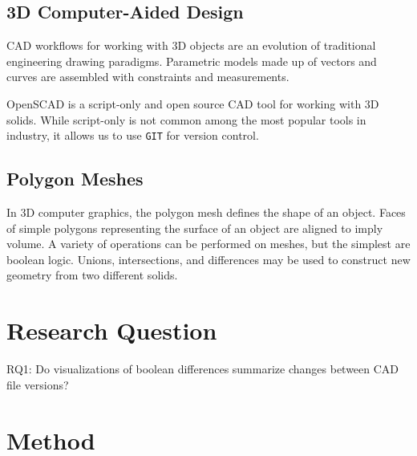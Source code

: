 \documentclass[sigconf,]{acmart}
\begin{document}



\subsection{3D Computer-Aided Design}

CAD workflows for working with 3D objects are an evolution of traditional engineering drawing paradigms.
Parametric models made up of vectors and curves are assembled with constraints and measurements.

OpenSCAD is a script-only and open source CAD tool for working with 3D solids.
While script-only is not common among the most popular tools in industry, it allows us to use \texttt{GIT} for version control.


\subsection{Polygon Meshes}

In 3D computer graphics, the polygon mesh defines the shape of an object.
Faces of simple polygons representing the surface of an object are aligned to imply volume.
A variety of operations can be performed on meshes, but the simplest are boolean logic.
Unions, intersections, and differences may be used to construct new geometry from two different solids.

\section{Research Question}

RQ1: Do visualizations of boolean differences summarize changes between CAD file versions?

\section{Method}

\end{document}
